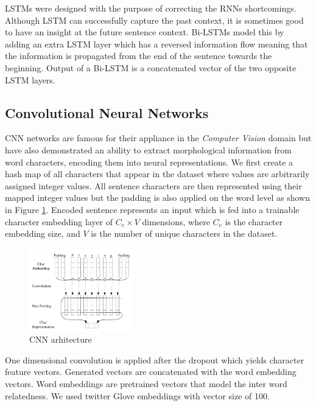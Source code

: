 \documentclass[10pt, a4paper]{article}
\begin{document}
LSTMs were designed with the purpose of correcting the RNNs shortcomings. Although LSTM can successfully capture the past context, it is sometimes good to have an insight at the future sentence context. Bi-LSTMs model this by adding an extra LSTM layer which has a reversed information flow meaning that the information is propagated from the end of the sentence towards the beginning. Output of a Bi-LSTM is a concatenated vector of the two opposite LSTM layers.

\subsection{Convolutional Neural Networks}

CNN networks are famous for their appliance in the \emph{Computer Vision} domain but have also demonstrated an ability to extract morphological information from word characters, encoding them into neural representations. We first create a hash map of all characters that appear in the dataset where values are arbitrarily assigned integer values. All sentence characters are then represented using their mapped integer values but the padding is also applied on the word level as shown in Figure \ref{fig:cnn_embed}. Encoded sentence represents an input which is fed into a trainable character embedding layer of $C_e \times V$ dimensions, where $C_e$ is the character embedding size, and $V$ is the number of unique characters in the dataset.

\begin{figure}
  \caption{CNN arhitecture}
  \label{fig:cnn_embed}
  \centering
    \includegraphics[width=0.4\textwidth]{imgs/cnn_embed.png}
\end{figure}

One dimensional convolution is applied after the dropout which yields character feature vectors. Generated vectors are concatenated with the word embedding vectors. Word embeddings are pretrained vectors that model the inter word relatedness. We used twitter Glove embeddings with vector size of 100.
\end{document}
